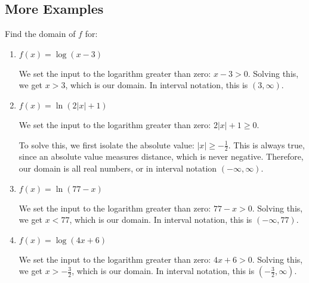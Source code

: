 \documentclass{ximera}
\begin{document}
\subsection{More Examples}
Find the domain of $f$ for:

\begin{enumerate}
	\item $f(x) = \log(x - 3)$
		\begin{expandable}
			\begin{explanation}

We set the input to the logarithm greater than zero: $x - 3 > 0$. Solving this, we get $x > 3$, which is our domain. In interval notation, this is $(3, \infty)$.
			\end{explanation} 
		\end{expandable}
	\item $f(x) = \ln(2|x| + 1)$
		\begin{expandable}
			\begin{explanation}
We set the input to the logarithm greater than zero: $2|x| + 1 \ge 0$.

To solve this, we first isolate the absolute value: $|x| \ge -\frac{1}{2}$. This is always true, since an absolute value measures distance, which is never negative. Therefore, our domain is all real numbers, or in interval notation $(-\infty, \infty)$.
			\end{explanation}
		\end{expandable}
	\item $f(x) = \ln(77 - x)$
		\begin{expandable}
			\begin{explanation}
We set the input to the logarithm greater than zero: $77-x> 0$. Solving this, we get $x < 77$, which is our domain. In interval notation, this is $(-\infty, 77)$.   
			\end{explanation}
		\end{expandable}
	\item $f(x) = \log(4x + 6)$
		\begin{expandable}
			\begin{explanation}
We set the input to the logarithm greater than zero: $4x + 6> 0$. Solving this, we get $x > -\frac{3}{2}$, which is our domain. In interval notation, this is $\left(-\frac{3}{2}, \infty\right)$. 
			\end{explanation}
		\end{expandable}
\end{enumerate}


\end{document}
